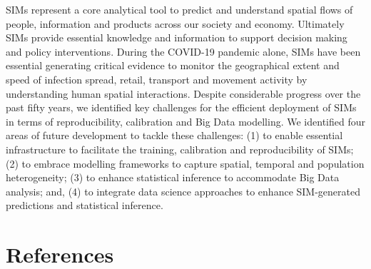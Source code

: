 \documentclass[11pt,letterpaper]{article}
\begin{document}
SIMs represent a core analytical tool to predict and understand spatial flows of people, information and products across our society and economy.
Ultimately SIMs provide essential knowledge and information to support decision making and policy interventions.
During the COVID-19 pandemic alone, SIMs have been essential generating critical evidence to monitor the geographical extent and speed of infection spread, retail, transport and movement activity by understanding human spatial interactions.
Despite considerable progress over the past fifty years, we identified key challenges for the efficient deployment of SIMs in terms of reproducibility, calibration and Big Data modelling.
We identified four areas of future development to tackle these challenges: (1) to enable essential infrastructure to facilitate the training, calibration and reproducibility of SIMs; (2) to embrace modelling frameworks to capture spatial, temporal and population heterogeneity; (3) to enhance statistical inference to accommodate Big Data analysis; and, (4) to integrate data science approaches to enhance SIM-generated predictions and statistical inference.

\hypertarget{references}{%
\section*{References}\label{references}}
\end{document}
